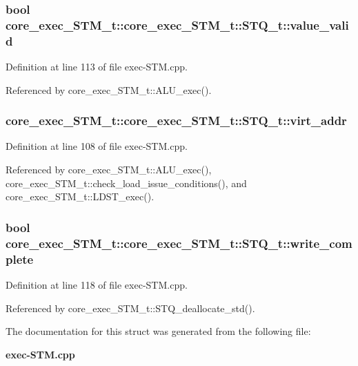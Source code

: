 \subsubsection[{value\_\-valid}]{\setlength{\rightskip}{0pt plus 5cm}bool core\_\-exec\_\-STM\_\-t::core\_\-exec\_\-STM\_\-t::STQ\_\-t::value\_\-valid}\label{structcore__exec__STM__t_1_1STQ__t_c7309f9b305bb70c48b964812fb529ee}




Definition at line 113 of file exec-STM.cpp.

Referenced by core\_\-exec\_\-STM\_\-t::ALU\_\-exec().
\subsubsection[{virt\_\-addr}]{ core\_\-exec\_\-STM\_\-t::core\_\-exec\_\-STM\_\-t::STQ\_\-t::virt\_\-addr}\label{structcore__exec__STM__t_1_1STQ__t_df5a89dae95bfa1fc633f617ea21731a}




Definition at line 108 of file exec-STM.cpp.

Referenced by core\_\-exec\_\-STM\_\-t::ALU\_\-exec(), core\_\-exec\_\-STM\_\-t::check\_\-load\_\-issue\_\-conditions(), and core\_\-exec\_\-STM\_\-t::LDST\_\-exec().
\subsubsection[{write\_\-complete}]{\setlength{\rightskip}{0pt plus 5cm}bool core\_\-exec\_\-STM\_\-t::core\_\-exec\_\-STM\_\-t::STQ\_\-t::write\_\-complete}\label{structcore__exec__STM__t_1_1STQ__t_f830c0a6715a14a3ec7505dd9625af02}




Definition at line 118 of file exec-STM.cpp.

Referenced by core\_\-exec\_\-STM\_\-t::STQ\_\-deallocate\_\-std().

The documentation for this struct was generated from the following file:\begin{CompactItemize}
\item 
{\bf exec-STM.cpp}\end{CompactItemize}
